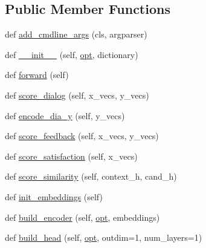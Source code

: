 \subsection*{Public Member Functions}
\begin{DoxyCompactItemize}
\item 
def \hyperlink{classself__feeding_1_1modules_1_1SelfFeedingModel_a91bbd7facdeff922d3e7ae97b58e3415}{add\+\_\+cmdline\+\_\+args} (cls, argparser)
\item 
def \hyperlink{classself__feeding_1_1modules_1_1SelfFeedingModel_a9180e0572d08648c219a57b9008b2e5d}{\+\_\+\+\_\+init\+\_\+\+\_\+} (self, \hyperlink{classself__feeding_1_1modules_1_1SelfFeedingModel_ad755fa0599d25f8b953de711995116ef}{opt}, dictionary)
\item 
def \hyperlink{classself__feeding_1_1modules_1_1SelfFeedingModel_a5cf9512d33efb28bbe68a9072f15bd64}{forward} (self)
\item 
def \hyperlink{classself__feeding_1_1modules_1_1SelfFeedingModel_a48355f310914844e39040c4c67156c09}{score\+\_\+dialog} (self, x\+\_\+vecs, y\+\_\+vecs)
\item 
def \hyperlink{classself__feeding_1_1modules_1_1SelfFeedingModel_a1197eb318b6aeff97f44d89dc397dc1c}{encode\+\_\+dia\+\_\+y} (self, y\+\_\+vecs)
\item 
def \hyperlink{classself__feeding_1_1modules_1_1SelfFeedingModel_a0cd21631fce3dbc552b7006bd25c7edb}{score\+\_\+feedback} (self, x\+\_\+vecs, y\+\_\+vecs)
\item 
def \hyperlink{classself__feeding_1_1modules_1_1SelfFeedingModel_a76344121fae2bc3a313339b1674da2c5}{score\+\_\+satisfaction} (self, x\+\_\+vecs)
\item 
def \hyperlink{classself__feeding_1_1modules_1_1SelfFeedingModel_ac08bbd26538c62f743664bf537ff438d}{score\+\_\+similarity} (self, context\+\_\+h, cand\+\_\+h)
\item 
def \hyperlink{classself__feeding_1_1modules_1_1SelfFeedingModel_a7f8b99a9c823753ddf1d94d6660a7f6d}{init\+\_\+embeddings} (self)
\item 
def \hyperlink{classself__feeding_1_1modules_1_1SelfFeedingModel_a895c868ad8a892d71cfc13849e48ad87}{build\+\_\+encoder} (self, \hyperlink{classself__feeding_1_1modules_1_1SelfFeedingModel_ad755fa0599d25f8b953de711995116ef}{opt}, embeddings)
\item 
def \hyperlink{classself__feeding_1_1modules_1_1SelfFeedingModel_a2326cdf2ff11cdf50102684875e31238}{build\+\_\+head} (self, \hyperlink{classself__feeding_1_1modules_1_1SelfFeedingModel_ad755fa0599d25f8b953de711995116ef}{opt}, outdim=1, num\+\_\+layers=1)
\end{DoxyCompactItemize}
